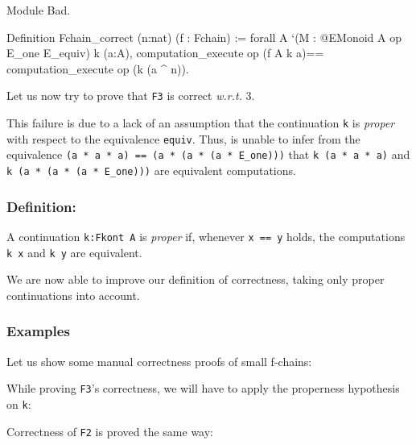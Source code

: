 \begin{Coqbad}
Module Bad.

Definition Fchain_correct  (n:nat) (f : Fchain) :=
  forall A `(M : @EMonoid A op E_one E_equiv) k (a:A),
    computation_execute op (f A k  a)==
    computation_execute op (k  (a ^ n)).
\end{Coqbad}

Let us now try to prove that \texttt{F3} is correct \emph{w.r.t.} $3$.


This failure is due to a lack of an assumption that the continuation
\texttt{k} is \emph{proper} with respect to the equivalence \texttt{equiv}.
Thus, \coq{} is unable to infer from the equivalence 
\texttt{(a * a * a) == (a * (a * (a * E\_one)))} \linebreak that 
\texttt{k (a * a * a)} and \texttt{k (a * (a * (a * E\_one)))} are 
equivalent computations.



\subsubsection{Definition:} 
A continuation \texttt{k:Fkont A} is \emph{proper}
if, whenever \linebreak[3] \texttt{x == y} holds, the computations \texttt{k x} and 
\texttt{k y} are equivalent.



We are now able to improve our definition of correctness, taking only
proper continuations into account.


\subsubsection{Examples}

Let us show some manual correctness proofs of  small f-chains:


 While proving \texttt{F3}'s correctness, we will have to apply
 the properness hypothesis on \texttt{k}:


Correctness of \texttt{F2} is proved the same way:


